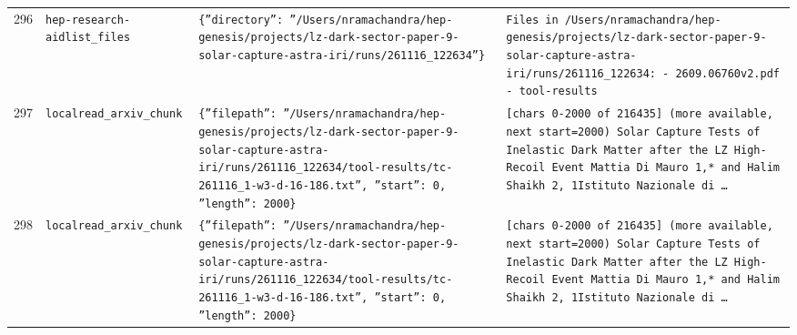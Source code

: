 \documentclass[11pt,a4paper]{article}
\begin{document}
\begin{longtable}{@{}p{}p{}p{}p{}@{}}
296 & \texttt{hep-research-aid}\newline\texttt{list\_\allowbreak{}files} & \texttt{\{''directory'':\allowbreak{} ''/\allowbreak{}Users/\allowbreak{}nramachandra/\allowbreak{}hep-genesis/\allowbreak{}projects/\allowbreak{}lz-dark-sector-paper-9-solar-capture-astra-iri/\allowbreak{}runs/\allowbreak{}261116\_\allowbreak{}122634''\}\allowbreak{}} & \texttt{Files in /\allowbreak{}Users/\allowbreak{}nramachandra/\allowbreak{}hep-genesis/\allowbreak{}projects/\allowbreak{}lz-dark-sector-paper-9-solar-capture-astra-iri/\allowbreak{}runs/\allowbreak{}261116\_\allowbreak{}122634:\allowbreak{}   - 2609.06760v2.pdf   - tool-results} \\
297 & \texttt{local}\newline\texttt{read\_\allowbreak{}arxiv\_\allowbreak{}chunk} & \texttt{\{''filepath'':\allowbreak{} ''/\allowbreak{}Users/\allowbreak{}nramachandra/\allowbreak{}hep-genesis/\allowbreak{}projects/\allowbreak{}lz-dark-sector-paper-9-solar-capture-astra-iri/\allowbreak{}runs/\allowbreak{}261116\_\allowbreak{}122634/\allowbreak{}tool-results/\allowbreak{}tc-261116\_\allowbreak{}1-w3-d-16-186.txt'',\allowbreak{} ''start'':\allowbreak{} 0,\allowbreak{} ''length'':\allowbreak{} 2000\}\allowbreak{}} & \texttt{[chars 0-2000 of 216435]\allowbreak{} (more available,\allowbreak{} next start=\allowbreak{}2000)\allowbreak{}  Solar Capture Tests of Inelastic Dark Matter after the LZ High-Recoil Event Mattia Di Mauro 1,\allowbreak{}* and Halim Shaikh 2,\allowbreak{}\dag{}\allowbreak{} 1Istituto Nazionale di \ldots{}\allowbreak{}} \\
298 & \texttt{local}\newline\texttt{read\_\allowbreak{}arxiv\_\allowbreak{}chunk} & \texttt{\{''filepath'':\allowbreak{} ''/\allowbreak{}Users/\allowbreak{}nramachandra/\allowbreak{}hep-genesis/\allowbreak{}projects/\allowbreak{}lz-dark-sector-paper-9-solar-capture-astra-iri/\allowbreak{}runs/\allowbreak{}261116\_\allowbreak{}122634/\allowbreak{}tool-results/\allowbreak{}tc-261116\_\allowbreak{}1-w3-d-16-186.txt'',\allowbreak{} ''start'':\allowbreak{} 0,\allowbreak{} ''length'':\allowbreak{} 2000\}\allowbreak{}} & \texttt{[chars 0-2000 of 216435]\allowbreak{} (more available,\allowbreak{} next start=\allowbreak{}2000)\allowbreak{}  Solar Capture Tests of Inelastic Dark Matter after the LZ High-Recoil Event Mattia Di Mauro 1,\allowbreak{}* and Halim Shaikh 2,\allowbreak{}\dag{}\allowbreak{} 1Istituto Nazionale di \ldots{}\allowbreak{}} \\

\end{longtable}
\end{document}
